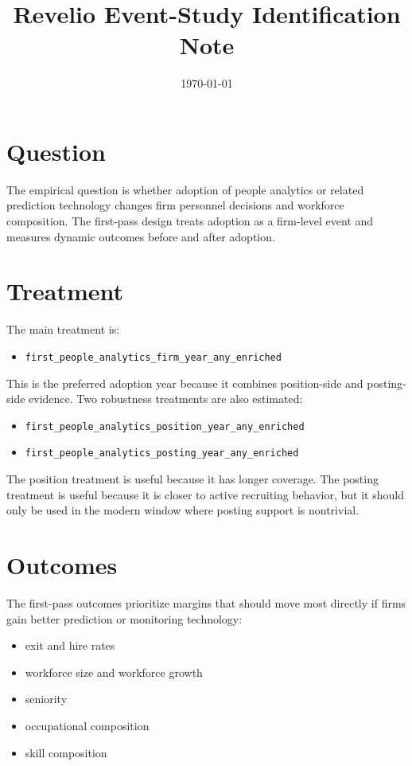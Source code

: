 \documentclass[11pt]{article}
\title{Revelio Event-Study Identification Note}
\author{}
\date{\today}
\begin{document}
\maketitle

\section*{Question}

The empirical question is whether adoption of people analytics or related prediction technology changes firm personnel decisions and workforce composition. The first-pass design treats adoption as a firm-level event and measures dynamic outcomes before and after adoption.

\section*{Treatment}

The main treatment is:

\begin{itemize}[leftmargin=1.5em]
    \item \texttt{first\_people\_analytics\_firm\_year\_any\_enriched}
\end{itemize}

This is the preferred adoption year because it combines position-side and posting-side evidence. Two robustness treatments are also estimated:

\begin{itemize}[leftmargin=1.5em]
    \item \texttt{first\_people\_analytics\_position\_year\_any\_enriched}
    \item \texttt{first\_people\_analytics\_posting\_year\_any\_enriched}
\end{itemize}

The position treatment is useful because it has longer coverage. The posting treatment is useful because it is closer to active recruiting behavior, but it should only be used in the modern window where posting support is nontrivial.

\section*{Outcomes}

The first-pass outcomes prioritize margins that should move most directly if firms gain better prediction or monitoring technology:

\begin{itemize}[leftmargin=1.5em]
    \item exit and hire rates
    \item workforce size and workforce growth
    \item seniority
    \item occupational composition
    \item skill composition
\end{itemize}
\end{document}
